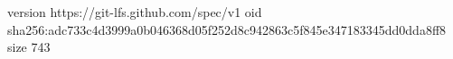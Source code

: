 version https://git-lfs.github.com/spec/v1
oid sha256:adc733c4d3999a0b046368d05f252d8c942863c5f845e347183345dd0dda8ff8
size 743
